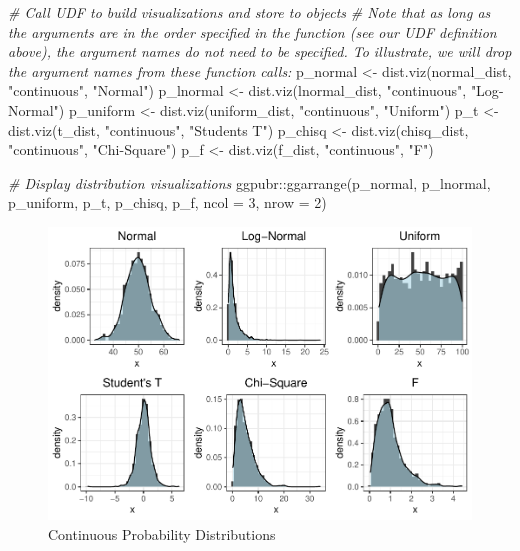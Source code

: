 \documentclass[
]{book}
\newenvironment{Shaded}{\begin{snugshade}}{\end{snugshade}}
\newcommand{\AttributeTok}[1]{\textcolor[rgb]{0.77,0.63,0.00}{#1}}
\newcommand{\CommentTok}[1]{\textcolor[rgb]{0.56,0.35,0.01}{\textit{#1}}}
\newcommand{\DecValTok}[1]{\textcolor[rgb]{0.00,0.00,0.81}{#1}}
\newcommand{\FunctionTok}[1]{\textcolor[rgb]{0.00,0.00,0.00}{#1}}
\newcommand{\NormalTok}[1]{#1}
\newcommand{\OtherTok}[1]{\textcolor[rgb]{0.56,0.35,0.01}{#1}}
\newcommand{\SpecialCharTok}[1]{\textcolor[rgb]{0.00,0.00,0.00}{#1}}
\newcommand{\StringTok}[1]{\textcolor[rgb]{0.31,0.60,0.02}{#1}}
\begin{document}
\begin{Shaded}
\begin{Highlighting}[]
\CommentTok{\# Call UDF to build visualizations and store to objects}
\CommentTok{\# Note that as long as the arguments are in the order specified in the function (see our UDF definition above), the argument names do not need to be specified. To illustrate, we will drop the argument names from these function calls:}
\NormalTok{p\_normal }\OtherTok{\textless{}{-}} \FunctionTok{dist.viz}\NormalTok{(normal\_dist, }\StringTok{"continuous"}\NormalTok{, }\StringTok{"Normal"}\NormalTok{)}
\NormalTok{p\_lnormal }\OtherTok{\textless{}{-}} \FunctionTok{dist.viz}\NormalTok{(lnormal\_dist, }\StringTok{"continuous"}\NormalTok{, }\StringTok{"Log{-}Normal"}\NormalTok{)}
\NormalTok{p\_uniform }\OtherTok{\textless{}{-}} \FunctionTok{dist.viz}\NormalTok{(uniform\_dist, }\StringTok{"continuous"}\NormalTok{, }\StringTok{"Uniform"}\NormalTok{)}
\NormalTok{p\_t }\OtherTok{\textless{}{-}} \FunctionTok{dist.viz}\NormalTok{(t\_dist, }\StringTok{"continuous"}\NormalTok{, }\StringTok{"Student\textquotesingle{}s T"}\NormalTok{)}
\NormalTok{p\_chisq }\OtherTok{\textless{}{-}} \FunctionTok{dist.viz}\NormalTok{(chisq\_dist, }\StringTok{"continuous"}\NormalTok{, }\StringTok{"Chi{-}Square"}\NormalTok{)}
\NormalTok{p\_f }\OtherTok{\textless{}{-}} \FunctionTok{dist.viz}\NormalTok{(f\_dist, }\StringTok{"continuous"}\NormalTok{, }\StringTok{"F"}\NormalTok{)}

\CommentTok{\# Display distribution visualizations}
\NormalTok{ggpubr}\SpecialCharTok{::}\FunctionTok{ggarrange}\NormalTok{(p\_normal, p\_lnormal, p\_uniform, p\_t, p\_chisq, p\_f,}
          \AttributeTok{ncol =} \DecValTok{3}\NormalTok{, }\AttributeTok{nrow =} \DecValTok{2}\NormalTok{)}
\end{Highlighting}
\end{Shaded}

\begin{figure}

{\centering \includegraphics{People_Analytics_Lifecycle_files/figure-latex/continous-dist-1} 

}

\caption{Continuous Probability Distributions}\label{fig:continous-dist}
\end{figure}
\end{document}
